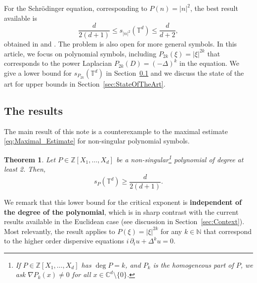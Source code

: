 \documentclass[11pt,reqno]{amsart}
\newtheorem{thm}{Theorem}[section]
\theoremstyle{definition}
\numberwithin{equation}{section}
\theoremstyle{remark}
\begin{document}
For the Schr\"odinger equation, 
corresponding to $P(n) = |n|^2$,
the best result available is
\begin{equation}
\frac{d}{2(d+1)} \leq s_{|n|^2}(\mathbb T^d) \leq  \frac{d}{d+2}, 
\end{equation} 
obtained in \cite[Prop 1 in Section 2]{MoyuaVega2008} and \cite[Prop. 3.1 and 3.2]{CompaanLucaStaffilani2021}.
The problem is also open for more general symbols. 
In this article, we focus on polynomial symbols, 
including $P_{2k}(\xi) = |\xi|^{2k}$
that corresponds to the power Laplacian $P_{2k}(D) = (-\Delta)^k$ in the equation. 
We give a lower bound for $s_{P_{2k}}(\mathbb T^d)$ in Section~\ref{sec:Results}
and we discuss the state of the art for upper bounds in Section~\ref{sec:StateOfTheArt}.


\subsection{The results}\label{sec:Results}
The main result of this note is a counterexample to the maximal estimate \eqref{eq:Maximal_Estimate} for non-singular polynomial symbols.

\begin{thm}\label{thm:Lebesgue}
Let $P \in \mathbb Z [X_1, \ldots, X_d]$ be a non-singular\footnote{If $P \in \mathbb Z[X_1, \ldots, X_d]$ has $\deg P = k$, and $P_k$ is the homogeneous part of $P$, 
we ask $\nabla P_k(x) \neq 0$ for all $x \in \mathbb C^d \setminus \{0\}$.
} polynomial of degree at least 2.
Then,
\begin{equation}
    s_P(\mathbb T^d) \geq \frac{d}{2(d+1)}. 
\end{equation}
\end{thm}

We remark that this lower bound for the critical exponent is \textbf{independent of the degree of the polynomial}, 
which is in sharp contrast with the current results available in the Euclidean case (see discussion in Section~\ref{sec:Context}). 
Most relevantly, 
the result applies to $P(\xi) = |\xi|^{2k}$ for any $k \in \mathbb N$ that correspond to the higher order dispersive equations $i \, \partial_t u + \Delta^k u = 0$. 
\end{document}
